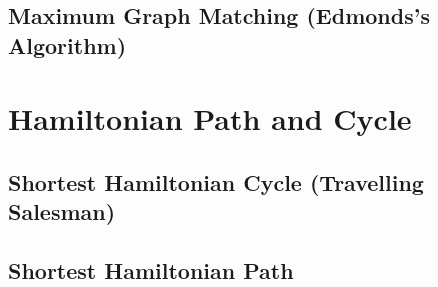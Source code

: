 \subsection{Maximum Graph Matching (Edmonds's Algorithm)}


\section{Hamiltonian Path and Cycle}
\setcounter{section}{8}
\setcounter{subsection}{0}
\subsection{Shortest Hamiltonian Cycle (Travelling Salesman)}

\subsection{Shortest Hamiltonian Path}

